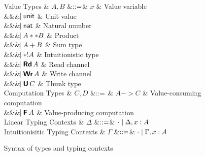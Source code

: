 \documentclass[acmsmall,review,anonymous]{acmart}\settopmatter{printfolios=true,printccs=false,printacmref=false}
\begin{document}
\begin{figure}[htbp]
  \centering

\begin{grammar}
  Value Types
  & $A,B$
      &$\mathrel{::=}$&
      $x$ & Value variable
      \\ &&& $\hspace{-1.02ex}\mathrel{\mid} \mathsf{unit}$ & Unit value
      \\ &&& $\hspace{-1.02ex}\mathrel{\mid} \mathsf{nat}$         & Natural number
      \\ &&& $\hspace{-1.02ex}\mathrel{\mid} A ** B$ & Product
      \\ &&& $\hspace{-1.02ex}\mathrel{\mid} A + B$ & Sum type
      \\ &&& $\hspace{-1.02ex}\mathrel{\mid} *! A$ & Intuitionistic type
      \\ &&& $\bnfaltbrk \tyRd{A}$ & Read channel
      \\ &&& $\bnfaltbrk \tyWr{A}$ & Write channel
      \\ &&& $\bnfaltbrk \tyU{C}$ & Thunk type
  \\[1ex]
  Computation Types
  & $C, D$
      &$\mathrel{::=}$ & 
             $A -> C$ & Value-consuming computation
      \\ &&& $\bnfaltbrk \tyF{A}$ & Value-producing computation
  \\[1ex]
  Linear Typing Contexts
  & $\Delta$
     &$\mathrel{::=}$& $\cdot \mathrel{\mid} \Delta,x:A$
  \\
  Intuitionisitic Typing Contexts
  & $\Gamma$
     &$\mathrel{::=}$& $\cdot \mathrel{\mid} \Gamma,x:A$
\end{grammar}

  \caption{Syntax of types and typing contexts}
  \label{fig:expr}
\end{figure}
\end{document}
